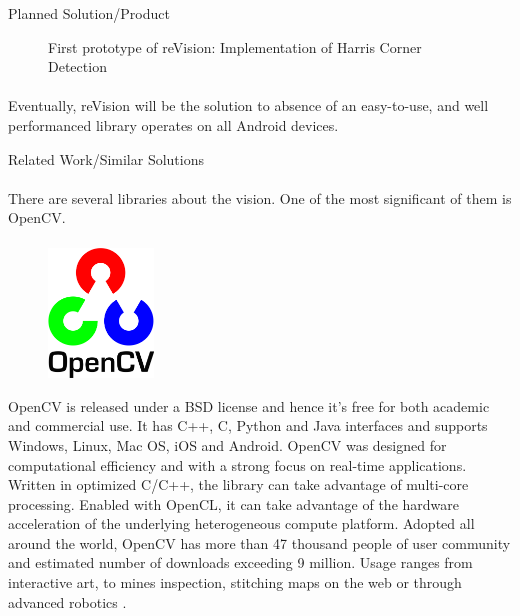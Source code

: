 \documentclass[12pt, a4paper]{article} \pagenumbering{gobble}
\begin{document}
\begin{section}{Planned Solution/Product}
\begin{figure}[h]
    \caption{First prototype of reVision: Implementation of Harris Corner Detection}
    \label{fig:mesh1}
  \end{figure}


  \paragraph{}{
  Eventually, reVision will be the solution to absence of an easy-to-use, and well performanced library operates on
  all Android devices.
  }

\end{section}
\newpage
\begin{section}{Related Work/Similar Solutions}
\paragraph{}{
  There are several libraries about the vision. One of the most significant of them is OpenCV.
}

  \paragraph{}{
  \begin{figure}
    \centering
    \includegraphics[width=0.25\textwidth]{opencv.png}
\end{figure}

OpenCV is released under a BSD license and hence it’s free for
both academic and commercial use. It has C++, C, Python and Java interfaces and supports Windows, Linux, Mac OS,
iOS and Android. OpenCV was designed for computational efficiency and with a strong focus on real-time applications.
Written in optimized C/C++, the library can take advantage of multi-core processing. Enabled with OpenCL, it can
take advantage of the hardware acceleration of the underlying heterogeneous compute platform. Adopted all around
the world, OpenCV has more than 47 thousand people of user community and estimated number of downloads exceeding 9
million. Usage ranges from interactive art, to mines inspection, stitching maps on the web or through advanced
robotics \cite{opencv}.

}
\end{section}
\end{document}

